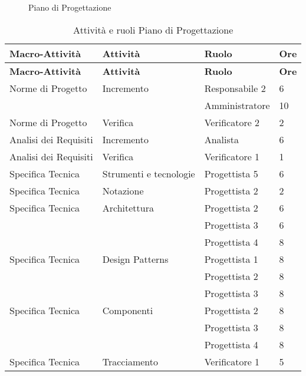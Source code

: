 {{	\begin{landscape}
		\thispagestyle{empty}
		\begin{figure}[H]
			\parbox[c][\textwidth][s]{\linewidth}{
			\centering
			\vspace*{\fill}
			\vspace*{\fill}
			\label{fig:pianoprogettazione}
			\caption{Piano di Progettazione}}
		\end{figure}
	\end{landscape}

	\renewcommand*{\arraystretch}{1.4}
	\begin{longtable} [c]{| l | l | l | l |}
		\caption{Attività e ruoli Piano di Progettazione \label{tab:pianoprogettazione}}\\
		 \hline
		 \textbf{Macro-Attività} & \textbf{Attività} & \textbf{Ruolo} & \textbf{Ore}\\
		 \hline
		 \endfirsthead
		 \hline
		 \textbf{Macro-Attività} & \textbf{Attività} & \textbf{Ruolo} & \textbf{Ore}\\
		 \hline
			\endhead
		 \hline
		 \endfoot
		 \hline
		 \endlastfoot
		 Norme di Progetto & Incremento & Responsabile 2 & 6\\
		 &	&	Amministratore & 10\\
		 Norme di Progetto & Verifica & Verificatore 2 & 2 \\
		 Analisi dei Requisiti & Incremento & Analista & 6 \\
		 Analisi dei Requisiti & Verifica & Verificatore 1 & 1 \\
		 Specifica Tecnica & Strumenti e tecnologie & Progettista 5 & 6 \\
		 Specifica Tecnica & Notazione & Progettista 2 & 2 \\
		 Specifica Tecnica & Architettura & Progettista 2 & 6\\
		 &	&	Progettista 3 & 6\\
		 &	&	Progettista 4 & 8\\
		 Specifica Tecnica & Design Patterns & Progettista 1 & 8\\
		 &	&	Progettista 2 & 8\\
		 &	&	Progettista 3 & 8\\
		 Specifica Tecnica & Componenti & Progettista 2 & 8\\
		 &	&	Progettista 3 & 8\\
		 &	&	Progettista 4 & 8\\
		 Specifica Tecnica & Tracciamento & Verificatore 1 & 5\\

\end{longtable}}}
